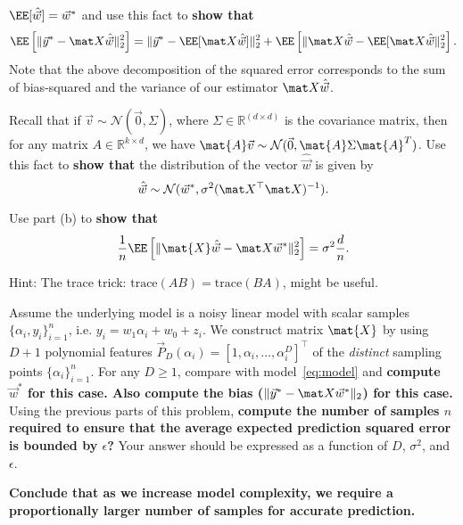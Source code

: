 \documentclass[preview]{standalone}
\begin{document}
\begin{Parts}

 $\EE[\hat{\vec{w}}] = \vec{w}^*$ and use this fact to
{\bf show that}
\begin{align*}
  \EE\left[\| \vec y^* - \mat X \hat{\vec w} \|_2^2\right]
  = \| \vec y^* - \EE[\mat X \hat{\vec w}] \|_2^2 +
  \EE\left[\| \mat X \hat{\vec w}  - \EE[\mat X \hat{\vec w}\|_2^2\right].
\end{align*}
Note that the above decomposition of the squared error corresponds to the sum of
bias-squared and the variance of our estimator $\mat X \hat{\vec w}$.



\Part Recall that if $\vec{v} \sim \mathcal{N}(\vec{0}, \Sigma)$, where
$\Sigma \in \mathbb{R}^{(d \times d)}$ is the covariance matrix,
then for any matrix $A \in \mathbb{R}^{k \times d}$,
we have $\mat{A}\vec{v} \sim \mathcal{N}(\vec{0}, \mat{A}\Sigma\mat{A}^T)$.
Use this fact to
{\bf show that} the distribution of the vector $\hat{\vec{w}}$ is given by
$$\hat{\vec{w}} \sim \mathcal{N}(\vec{w}^*, \sigma^2(\mat X^\top \mat X)^{-1}).$$



\Part
Use part (b) to {\bf show that}
$$\frac{1}{n} \EE \left[ \| \mat{X} \hat{\vec{w}} - \mat X \vec w^* \|_2^2 \right]
= \sigma^2 \frac{d}{n}.$$

Hint: The trace trick: ${\mathrm{trace}}(AB) = {\mathrm{trace}}(BA)$, might be useful.



\Part
Assume the underlying model is a noisy linear model with scalar samples
$\{\alpha_i, y_i\}_{i=1}^n$, i.e. $y_i = w_1 \alpha_i + w_0 + z_i$.
We construct matrix $\mat{X}$ by using $D+1$ polynomial features
$\vec{P}_D(\alpha_i) = [1, \alpha_i, \ldots, \alpha_i^D]^\top$
of the \emph{distinct} sampling points $\{\alpha_i\}_{i=1}^n$.
For any $D \geq 1$, compare with model~\eqref{eq:model} and
{\bf compute $\vec{w}^*$ for this case.
Also compute the bias ($\Vert \vec{y}^* - \mat X \vec{w}^*\Vert_2$) for this case.}
Using the previous parts of this problem, {\bf compute the number of
  samples $n$ required to ensure that the average expected prediction squared error is
bounded by $\epsilon$?} Your answer should be expressed as a function of $D$,
$\sigma^2$, and $\epsilon$.

{\bf Conclude that as we increase model complexity, we require a
  proportionally larger number of samples for accurate prediction.}




\end{Parts}
\end{document}
